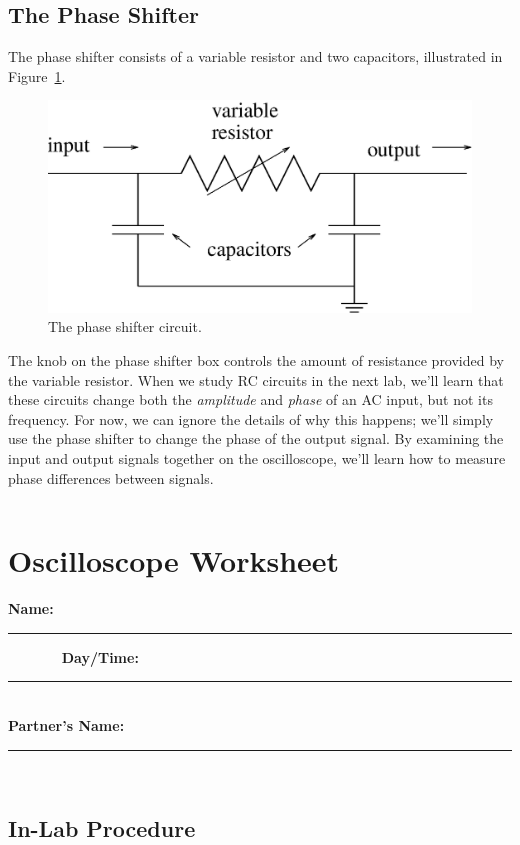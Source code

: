 \subsection{The Phase Shifter}

The phase shifter consists of a variable resistor and two capacitors, 
illustrated in Figure~\ref{fig:scope:phaseshifter}.
\begin{figure}[htb]
\centering \epsfxsize=8cm \includegraphics[scale=0.5]{4_oscilloscope/phaseshifter.eps}
\caption{The phase shifter circuit.}
\label{fig:scope:phaseshifter}
\end{figure}
The knob on the phase shifter box controls the amount of resistance provided
by the variable resistor.  When we study RC circuits in the next lab, we'll
learn that these circuits change both the {\it amplitude} and {\it phase} of
an AC input, but not its frequency.  For now, we can ignore the details of
why this happens; we'll simply use the phase shifter to change the phase of the
output signal.  By examining the input and output signals together on the 
oscilloscope, we'll learn how to measure phase differences between signals.

\vfill
\pagebreak
$$
$$
\vfill
\clearpage
\newpage


\renewcommand{\thesection}{\thechapter.W}

\section{Oscilloscope Worksheet}

{\bf \Large Name:}~ \rule{5cm}{.1mm}~~~~~~~
{\bf \Large Day/Time:}~\rule{3cm}{.1mm}\\
{\bf \Large Partner's Name:}~\rule{6cm}{.1mm}\\
   \subsection{In-Lab Procedure}

